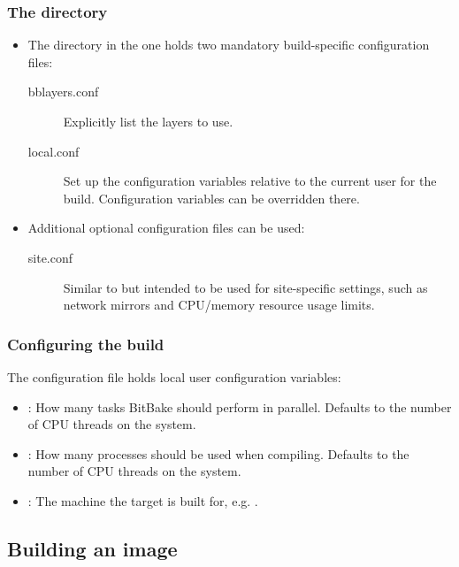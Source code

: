 \begin{frame}
  \frametitle{The  directory}
  \begin{itemize}
    \item The  directory in the  one holds two
      mandatory build-specific configuration files:
    \begin{description}
      \item[bblayers.conf] Explicitly list the layers to use.
      \item[local.conf] Set up the configuration variables relative to
        the current user for the build. Configuration variables can be
        overridden there.
    \end{description}
    \item Additional optional configuration files can be used:
    \begin{description}
      \item[site.conf] Similar to  but intended to be used
        for site-specific settings, such as network mirrors and CPU/memory
        resource usage limits.
    \end{description}
  \end{itemize}
\end{frame}

\begin{frame}
  \frametitle{Configuring the build}
    The  configuration file holds local
    user configuration variables:
    \begin{itemize}
      \item {}: How many tasks BitBake should perform
        in parallel. Defaults to the number of CPU threads on the system.
      \item {}: How many processes should be used when
        compiling. Defaults to the number of CPU threads on the system.
      \item {}: The machine the target is built for, e.g.
        .
    \end{itemize}
\end{frame}

\subsection{Building an image}

